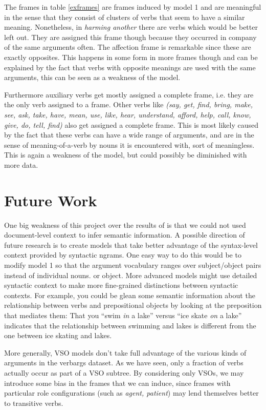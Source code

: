 \documentclass{article} %
\begin{document}
The frames in table \ref{exframes} are frames induced by model 1 and are meaningful in the sense that they consist of clusters of verbs that seem to have a similar meaning. Nonetheless, in \textit{harming another} there are verbs which would be better left out. They are assigned this frame though because they occurred in company of the same arguments often. The affection frame is remarkable since these are exactly opposites. This happens in some form in more frames though and can be explained by the fact that verbs with opposite meanings are used with the same arguments, this can be seen as a weakness of the model.

Furthermore auxiliary verbs get mostly assigned a complete frame, i.e. they are the only verb assigned to a frame. Other verbs like \textit{(say, get, find, bring, make, see, ask, take, have, mean, use, like, hear, understand, afford, help, call, know, give, do, tell, find)} also get assigned a complete frame. This is most likely caused by the fact that these verbs can have a wide range of arguments, and are in the sense of meaning-of-a-verb by nouns it is encountered with, sort of meaningless. This is again a weakness of the model, but could possibly be diminished with more data.   

\section{Future Work}
One big weakness of this project over the results of \citet{oconnor2013} is that 
we could not used document-level context to infer semantic information.
A possible direction of future research is to create models that take better 
advantage of the syntax-level context provided by syntactic ngrams. 
One easy way to do this would be to modify model 1 so that the argument 
vocabulary ranges over subject/object pairs instead of individual nouns.
or object.
More advanced models might use detailed syntactic context to make more fine-grained
distinctions between syntactic contexts.
For example, you could be glean some semantic information about the relationship between
verbs and prepositional objects by looking at the preposition that mediates them: 
That you ``swim \emph{in} a lake'' versus ``ice skate \emph{on} a lake'' 
indicates that the relationship between swimming and lakes is different from the one between
ice skating and lakes.

More generally, VSO models don't take full advantage of the various kinds of arguments
in the verbargs dataset. 
As we have seen, only a fraction of verbs actually occur as part of a VSO subtree.
By considering only VSOs, we may introduce some bias in the frames that we can induce,
since frames with particular role configurations (such as \emph{agent, patient}) may
lend themselves better to transitive verbs. 
\end{document}
